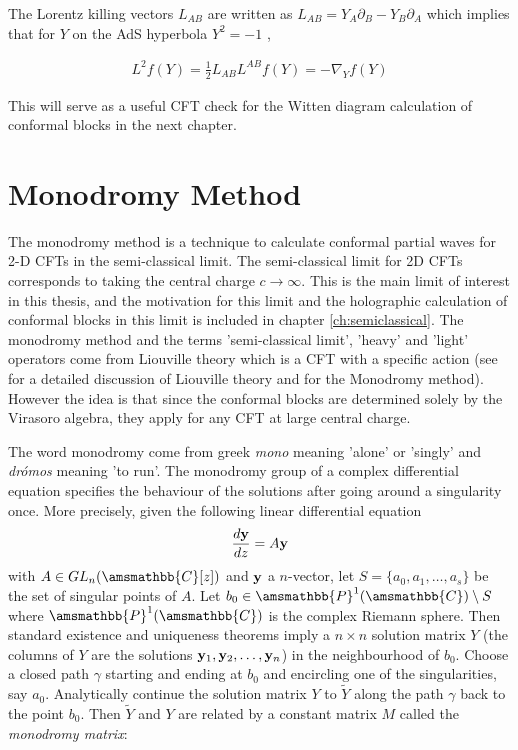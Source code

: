 The Lorentz killing vectors $L_{AB}$ are written as  $L_{AB}= Y_A \partial_B-Y_B \partial_A$ which implies that for $Y$ on the AdS hyperbola $Y^2=-1$ ,

\begin{align}
 L^2 f(Y) = \frac{1}{2}L_{AB}L^{AB} f(Y) = - \nabla_Y f(Y)
\end{align}

This will serve as a useful CFT check for the Witten diagram calculation of conformal blocks in the next chapter.

\section{Monodromy Method}



The monodromy method is a technique to calculate conformal partial waves for 2-D CFTs in the semi-classical limit. The semi-classical limit for 2D CFTs corresponds to taking the central charge $c \to \infty$. This is the main limit of interest in this thesis, and the motivation for this limit and the holographic calculation of conformal blocks in this limit is included in chapter \ref{ch:semiclassical}. The monodromy method and the terms 'semi-classical limit', 'heavy' and 'light' operators come from Liouville theory which is a CFT with a specific action (see \cite{Harlow:2011ny} for a detailed discussion of Liouville theory and \cite{Harlow:2011ny,Fitzpatrick:2014vua,Hartman:2013mia} for the Monodromy method). However the idea is that since the conformal blocks are determined solely by the Virasoro algebra, they apply for any CFT at large central charge\cite{Hartman:2013mia}.

The word monodromy come from greek \emph{mono} meaning 'alone' or 'singly' and \emph{dr\'omos} meaning 'to run'. The monodromy group of a complex differential equation specifies the behaviour of the solutions after going around a singularity once. More precisely, given the following linear differential equation 
  \begin{align} \label{ch3:linear_system}
   \frac{d\bold{y}}{dz}=A\bold{y}
  \end{align}
 with $A \in GL_n(\amsmathbb{C}[z])$ and $\bold{y}$ a $n$-vector, let $S=\{a_0,a_1,\dots,a_s\}$ be the set of singular points of $A$. Let $b_0 \in \amsmathbb{P}^1(\amsmathbb{C})\setminus S$ where  $\amsmathbb{P}^1(\amsmathbb{C})$ is the complex Riemann sphere. Then standard existence and uniqueness theorems imply a $n\times n$ solution matrix $Y$ (the columns of $Y$ are the solutions $\bold{y}_1,\bold{y}_2,\dots,\bold{y}_n$) in the neighbourhood of $b_0$. Choose a closed path $\gamma$ starting and ending at $b_0$ and encircling one of the singularities, say $a_0$. Analytically continue the solution matrix $Y$ to $\tilde{Y}$ along the path $\gamma$ back to the point $b_0$. Then $\tilde{Y}$ and $Y$ are related by a constant matrix $M$ called the \emph{monodromy matrix}:
 
